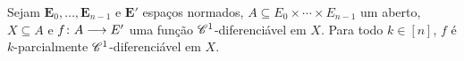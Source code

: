 \begin{proposition}
\label{prop:diferenciabilidade.continua.diferenciabilidade.parcial.continua}
Sejam $\bm E_0, \ldots, \bm E_{n-1}$ e $\bm E'$ espaços normados, $A \subseteq E_0 \times \cdots \times E_{n-1}$ um aberto, $X \subseteq A$ e ${f}\colon {A} \longrightarrow {E'}$ uma função $\mathscr{C}^1$-diferenciável em $X$. Para todo $k \in [n]$, $f$ é $k$-parcialmente $\mathscr{C}^1$-diferenciável em $X$.
\end{proposition}
\begin{comment}
\begin{proof}
Sejam $\bm E := \bm E_0 \times \ldots \times \bm E_{n-1}$, $k \in [n]$, $x \in X$ e $V \subseteq A$ uma vizinhança de $x$ em que $f$ é diferenciável e tal que $\D f$ é contínua em $x$. Seja $r \in \intaa{0}{\infty}$ tal que $\bola{x}{r} \subseteq V$. Por \ref{prop:diferenciabilidade.diferenciabilidade.parcial}, para todo $x' \in \bola{x}{r}$ e todo $v_k \in E_k$ vale que $f$ é $k$-parcialmente diferenciável em $x'$ e $\D_k f|_{x'}(v_k) = \D f|_{x'}(\inclu_k(v_k))$. Como $\nor{\inclu_k(v_k)}_{E} = \nor{v_k}_{E_k}$ (em qualquer norma $p$ no produto), da continuidade da diferencial em $V$ segue que
	\begin{align*}
	\nor{(\D_k f|_{x'} - \D_k f|_x)(v_k)}_{E'} &= \nor{(\D f|_{x'} - \D f|_x)(\inclu_k(v_k))}_{E'} \\
		&\leq \nor{\D f|_{x'} - \D f|_x}_{\toplin(E,E')}\nor{\inclu_k(v_k)}_{E} \\
		&= \nor{\D f|_{x'} - \D f|_x}_{\toplin(E,E')}\nor{v_k}_{E_k},
	\end{align*}
portanto
	\begin{equation*}
	\nor{(\D_k f|_{x'} - \D_k f|_x)}_{\toplin(E_k,E')} \leq \nor{\D f|_{x'} - \D f|_x}_{\toplin(E,E')}.
	\end{equation*}
Pela continuidade de $\D f$ em $x$, segue que $\D_k f$ é contínua em $x$.
\end{proof}
\end{comment}
